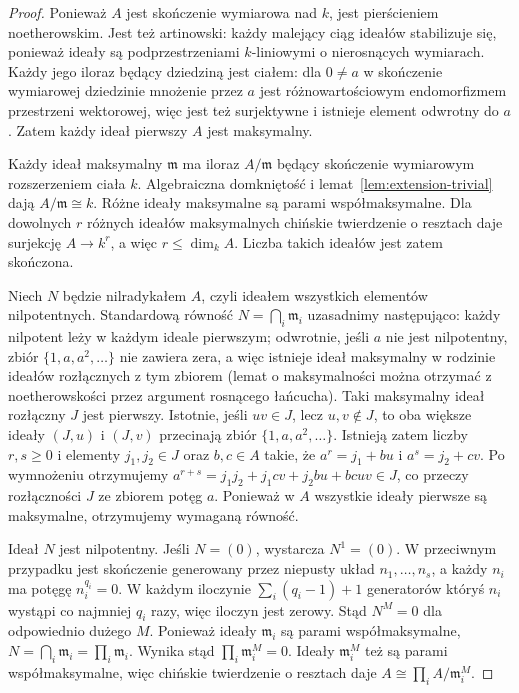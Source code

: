 \begin{proof}
Ponieważ $A$ jest skończenie wymiarowa nad $k$, jest
pierścieniem noetherowskim. Jest też artinowski:
każdy malejący ciąg ideałów stabilizuje się, ponieważ
ideały są podprzestrzeniami $k$-liniowymi o nierosnących
wymiarach. Każdy jego iloraz będący dziedziną jest ciałem:
dla $0\ne a$ w skończenie wymiarowej dziedzinie
mnożenie przez $a$ jest różnowartościowym endomorfizmem
przestrzeni wektorowej, więc jest też surjektywne
i istnieje element odwrotny do $a$.
Zatem każdy ideał pierwszy $A$ jest maksymalny.

Każdy ideał maksymalny $\mathfrak m$ ma iloraz $A/\mathfrak m$
będący skończenie wymiarowym rozszerzeniem ciała $k$.
Algebraiczna domkniętość i lemat~\ref{lem:extension-trivial}
dają $A/\mathfrak m\cong k$.
Różne ideały maksymalne są parami współmaksymalne.
Dla dowolnych $r$ różnych ideałów maksymalnych chińskie
twierdzenie o resztach daje surjekcję $A\to k^r$,
a więc $r\le\dim_k A$. Liczba takich ideałów jest
zatem skończona.

Niech $N$ będzie nilradykałem $A$, czyli ideałem wszystkich
elementów nilpotentnych. Standardową równość
$N=\bigcap_i\mathfrak m_i$ uzasadnimy następująco:
każdy nilpotent leży w każdym ideale pierwszym;
odwrotnie, jeśli $a$ nie jest nilpotentny, zbiór
$\{1,a,a^2,\dots\}$ nie zawiera zera, a więc istnieje
ideał maksymalny w rodzinie ideałów rozłącznych z tym
zbiorem (lemat o maksymalności można otrzymać z
noetherowskości przez argument rosnącego łańcucha).
Taki maksymalny ideał rozłączny $J$ jest pierwszy.
Istotnie, jeśli $uv\in J$, lecz $u,v\notin J$, to oba
większe ideały $(J,u)$ i $(J,v)$ przecinają zbiór
$\{1,a,a^2,\dots\}$. Istnieją zatem liczby $r,s\ge0$
i elementy $j_1,j_2\in J$ oraz $b,c\in A$ takie, że
$a^r=j_1+bu$ i $a^s=j_2+cv$.
Po wymnożeniu otrzymujemy
$a^{r+s}=j_1j_2+j_1cv+j_2bu+bcuv\in J$,
co przeczy rozłączności $J$ ze zbiorem potęg $a$.
Ponieważ w $A$ wszystkie ideały pierwsze są maksymalne,
otrzymujemy wymaganą równość.

Ideał $N$ jest nilpotentny. Jeśli $N=(0)$, wystarcza
$N^1=(0)$. W przeciwnym przypadku jest skończenie
generowany przez niepusty układ $n_1,\dots,n_s$,
a każdy $n_i$ ma potęgę $n_i^{q_i}=0$.
W każdym iloczynie $\sum_i(q_i-1)+1$ generatorów
któryś $n_i$ wystąpi co najmniej $q_i$ razy,
więc iloczyn jest zerowy.
Stąd $N^M=0$ dla odpowiednio dużego $M$.
Ponieważ ideały $\mathfrak m_i$ są parami współmaksymalne,
$N=\bigcap_i\mathfrak m_i=\prod_i\mathfrak m_i$.
Wynika stąd $\prod_i\mathfrak m_i^M=0$.
Ideały $\mathfrak m_i^M$ też są parami współmaksymalne,
więc chińskie twierdzenie o resztach daje
$A\cong\prod_i A/\mathfrak m_i^M$.


\end{proof}
